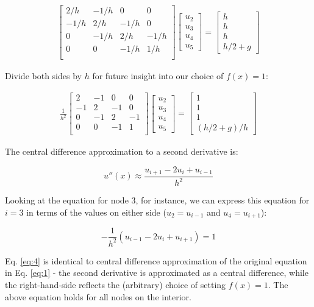 \documentclass[10pt]{article}
\newcommand{\beq}{\begin{equation}}
\newcommand{\eeq}{\end{equation}}
\newcommand{\beqa}{\begin{equation}\begin{aligned}}
\newcommand{\eeqa}{\end{aligned}\end{equation}}
\begin{document}
\beqa
\label{eq:3}
\begin{bmatrix}
 2/h & -1/h & 0 & 0 \\
 -1/h & 2/h & -1/h & 0 \\
 0 & -1/h & 2/h & -1/h\\
 0 & 0 & -1/h & 1/h\\
\end{bmatrix}
\begin{bmatrix}u_2\\u_3\\u_4\\u_5\end{bmatrix} = 
\begin{bmatrix}
h\\h\\h\\h/2+g
\end{bmatrix}
\eeqa

Divide both sides by \(h\) for future insight into our choice of \(f(x)=1\):

\beqa
\label{eq:3}\frac{1}{h^2}
\begin{bmatrix}
 2 & -1 & 0 & 0 \\
 -1 & 2 & -1 & 0 \\
 0 & -1 & 2 & -1\\
 0 & 0 & -1 & 1\\
\end{bmatrix}
\begin{bmatrix}u_2\\u_3\\u_4\\u_5\end{bmatrix} = 
\begin{bmatrix}
1\\1\\1\\(h/2+g)/h
\end{bmatrix}
\eeqa

The central difference approximation to a second derivative is:

\beq
u''(x)\approx \frac{u_{i+1}-2u_i+u_{i-1}}{h^2}
\eeq

Looking at the equation for node 3, for instance, we can express this equation for \(i=3\) in terms of the values on either side (\(u_2=u_{i-1}\) and \(u_4=u_{i+1}\)):

\beq
\label{eq:4}
-\frac{1}{h^2}\left(u_{i-1}-2u_i+u_{i+1}\right)=1
\eeq

Eq. \eqref{eq:4} is identical to central difference approximation of the original equation in Eq. \eqref{eq:1} - the second derivative is approximated as a central difference, while the right-hand-side reflects the (arbitrary) choice of setting \(f(x)=1\). The above equation holds for all nodes on the interior. 
\end{document}
